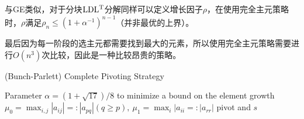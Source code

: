 \documentclass[a4paper,10pt]{ctexart}
\begin{document}
与GE类似，对于分块$ {\rm LDL^T} $分解同样可以定义增长因子$ \rho $，在使用完全主元策略时，$ \rho $满足$ \rho_n \leqslant (1+\alpha^{-1})^{n-1} $（并非最优的上界）。

最后因为每一阶段的选主元都需要找到最大的元素，所以使用完全主元策略需要进行$ O(n^3) $次比较，因此是一种比较昂贵的策略。
\begin{algorithm}[htbp]
    \caption{(Bunch-Parlett) Complete Pivoting Strategy}\label{alg:LDLCP}
    Parameter $ \alpha = (1+\sqrt{17}) / 8 $ to minimize a bound on the element growth\;
    $ \mu_0 = \max_{i,j}|a_{ij}| = :|a_{pq}|(q\geqslant p), \ \mu_1 = \max_{i}|a_{ii} =: |a_{rr}| $\;
    \Return pivot and $ s $\;
\end{algorithm}
\end{document}
